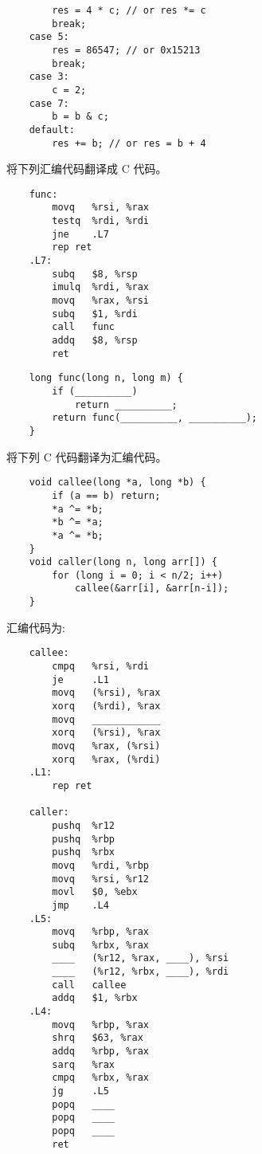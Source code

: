 \begin{problems}
\begin{verbatim}
        res = 4 * c; // or res *= c
        break;
    case 5:
        res = 86547; // or 0x15213
        break;
    case 3:
        c = 2;
    case 7:
        b = b & c;
    default:
        res += b; // or res = b + 4
        \end{verbatim}
        \pro 将下列汇编代码翻译成 C 代码。
        \begin{verbatim}
    func:
        movq   %rsi, %rax
        testq  %rdi, %rdi
        jne    .L7
        rep ret
    .L7:
        subq   $8, %rsp
        imulq  %rdi, %rax
        movq   %rax, %rsi
        subq   $1, %rdi
        call   func
        addq   $8, %rsp
        ret
        \end{verbatim}
        \begin{verbatim}
    long func(long n, long m) {
        if (__________)
            return __________;
        return func(__________, __________);
    }
        \end{verbatim}
        \pro 将下列 C 代码翻译为汇编代码。
        \begin{verbatim}
    void callee(long *a, long *b) {
        if (a == b) return;
        *a ^= *b;
        *b ^= *a;
        *a ^= *b;
    }
    void caller(long n, long arr[]) {
        for (long i = 0; i < n/2; i++)
            callee(&arr[i], &arr[n-i]);
    }
        \end{verbatim}
        汇编代码为:
        \begin{verbatim}
    callee:
        cmpq   %rsi, %rdi
        je     .L1
        movq   (%rsi), %rax
        xorq   (%rdi), %rax
        movq   ____________
        xorq   (%rsi), %rax
        movq   %rax, (%rsi)
        xorq   %rax, (%rdi)
    .L1:
        rep ret

    caller:
        pushq  %r12
        pushq  %rbp
        pushq  %rbx
        movq   %rdi, %rbp
        movq   %rsi, %r12
        movl   $0, %ebx
        jmp    .L4
    .L5:
        movq   %rbp, %rax
        subq   %rbx, %rax
        ____   (%r12, %rax, ____), %rsi
        ____   (%r12, %rbx, ____), %rdi
        call   callee
        addq   $1, %rbx
    .L4:
        movq   %rbp, %rax
        shrq   $63, %rax
        addq   %rbp, %rax
        sarq   %rax
        cmpq   %rbx, %rax
        jg     .L5
        popq   ____
        popq   ____
        popq   ____
        ret
        \end{verbatim}
        

\end{problems}
